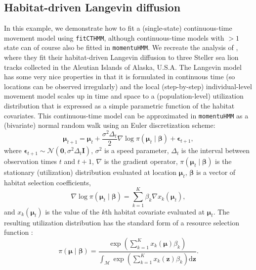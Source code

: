 \documentclass[12pt]{article}\usepackage[]{graphicx}\usepackage[]{xcolor}
\begin{document}
\subsection{Habitat-driven Langevin diffusion}
\label{sec:langevin}
In this example, we demonstrate how to fit a (single-state) continuous-time movement model using \verb|fitCTHMM|, although continuous-time models with $>1$ state can of course also be fitted in \verb|momentuHMM|. We recreate the analysis of \citet{MichelotEtAl2019}, where they fit their habitat-driven Langevin diffusion to three Steller sea lion tracks collected in the Aleutian Islands of Alaska, U.S.A. The Langevin model has some very nice properties in that it is formulated in continuous time (so locations can be observed irregularly) and the local (step-by-step) individual-level movement model scales up in time and space to a (population-level) utilization distribution that is expressed as a simple parametric function of the habitat covariates. This continuous-time model can be approximated in \verb|momentuHMM| as a (bivariate) normal random walk using an Euler discretization scheme:
\begin{equation}
\label{eq:lang1Euler}
    \boldsymbol{\mu}_{t+1} = \boldsymbol{\mu}_t + \frac{\sigma^2 \Delta_t}{2} \nabla \log \pi \left(\boldsymbol{\mu}_t \mid \boldsymbol{\beta} \right) + \boldsymbol{\epsilon}_{t+1},
\end{equation}
where $\boldsymbol{\epsilon}_{t+1} \sim \mathcal{N} \left(\mathbf{0},\sigma^2 \Delta_t \mathbf{I} \right)$, $\sigma^2$ is a speed parameter, $\Delta_t$ is the interval between observation times $t$ and $t+1$, $\nabla$ is the gradient operator, $\pi \left(\boldsymbol{\mu}_t \mid \boldsymbol{\beta} \right)$ is the stationary (utilization) distribution evaluated at location $\boldsymbol{\mu}_t$, $\boldsymbol{\beta}$ is a vector of habitat selection coefficients,
\begin{equation}
\label{eq:rsfms}
    \nabla \log \pi \left(\boldsymbol{\mu}_t \mid \boldsymbol{\beta} \right) = \sum_{k=1}^K \beta_k \nabla x_k \left( \boldsymbol{\mu}_t \right),
\end{equation}
and $x_k \left( \boldsymbol{\mu}_t \right)$ is the value of the $k$th habitat covariate evaluated at $\boldsymbol{\mu}_t$.
The resulting utilization distribution has the standard form of a resource selection function \citep[e.g.][]{Manly2010}:
\begin{equation}
\label{eq:rsf1}
    \pi \left(\boldsymbol{\mu} \mid \boldsymbol{\beta} \right) = \frac{\exp \left(\sum_{k=1}^K x_k\left(\boldsymbol{\mu} \right) \beta_k \right)}{\int_{\mathcal{M}} \exp \left(\sum_{k=1}^K x_k\left(\mathbf{z} \right) \beta_k \right) \text{d} \mathbf{z}}.
\end{equation}
\end{document}

